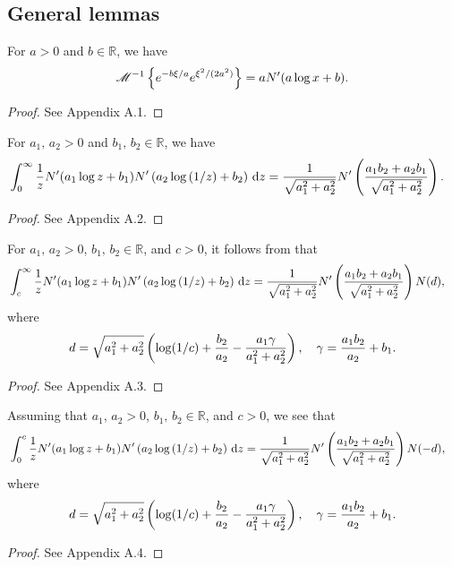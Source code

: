 \subsection{General lemmas}
	\begin{lemma}
		\label{lem:2}
	For $a > 0$ and $b \in \mathbb{R}$, we have
	\begin{equation*}
		\mathscr M^{-1}\left\{ e^{-b\xi/a}e^{\xi^2/(2a^2)} \right\} = aN'(a\log x + b).
	\end{equation*}
	\end{lemma}
\begin{proof}
	See Appendix A.1.
\end{proof}
	\begin{lemma}
		\label{lem:1}
		For $a_1, \, a_2 > 0$ and $b_1, \, b_2 \in \mathbb{R}$, we have
			\begin{align*}
				&\int_0^\infty \frac{1}{z}N'(a_1\log z + b_1)N'\left(a_2\log\left( 1/z \right) + b_2 \right) \, \mathrm d z =  \frac{1}{\sqrt{a_1^2 + a_2^2}}N'\left( \frac{a_1b_2 + a_2b_1}{\sqrt{a_1^2+a_2^2}} \right).
			\end{align*}
	\end{lemma}
	\begin{proof}
		See Appendix A.2.
	\end{proof}
	\begin{lemma}
		\label{lem:2b}
		For $a_1, \, a_2 > 0$, $b_1, \, b_2 \in \mathbb{R}$, and $c > 0$, it follows from that
		\begin{align*}
			&\int_c^\infty \frac{1}{z}N'(a_1\log z + b_1)N'\left(a_2\log\left( 1/z \right) + b_2 \right) \, \mathrm d z =  \frac{1}{\sqrt{a_1^2 + a_2^2}}N'\left( \frac{a_1b_2 + a_2b_1}{\sqrt{a_1^2+a_2^2}} \right)N(d),
		\end{align*}
		where
		$$
			d = \sqrt{a_1^2+a_2^2}\left( \log(1/c) + \frac{b_2}{a_2} - \frac{a_1\gamma}{a_1^2+a_2^2} \right), \quad
			\gamma = \frac{a_1b_2}{a_2} + b_1.
		$$
	\end{lemma}
	\begin{proof}
		See Appendix A.3.
	\end{proof}
	
	\begin{lemma}
		\label{lem:2bb}
		Assuming that $a_1, \, a_2 > 0$, $b_1, \, b_2 \in \mathbb{R}$, and $c > 0$, we see that
		\begin{align*}
			&\int_0^c \frac{1}{z}N'(a_1\log z + b_1)N'\left(a_2\log\left( 1/z \right) + b_2 \right) \, \mathrm d z =  \frac{1}{\sqrt{a_1^2 + a_2^2}}N'\left( \frac{a_1b_2 + a_2b_1}{\sqrt{a_1^2+a_2^2}} \right)N(-d),
		\end{align*}
		where
		$$
			d = \sqrt{a_1^2+a_2^2}\left( \log(1/c) + \frac{b_2}{a_2} - \frac{a_1\gamma}{a_1^2+a_2^2} \right), \quad
			\gamma = \frac{a_1b_2}{a_2} + b_1.
		$$
	\end{lemma}
	\begin{proof}
		See Appendix A.4.
	\end{proof}

